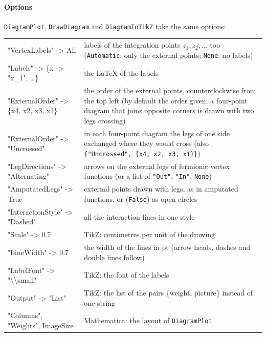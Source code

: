 \documentclass[11pt,a4paper]{article}
\newcommand{\pkg}[1]{\texttt{#1}}
\begin{document}
\paragraph{Options} \pkg{DiagramPlot}, \pkg{DrawDiagram} and \pkg{DiagramToTikZ} take the same options:
\begin{center}
\small
\begin{tabularx}{\textwidth}{@{}>{\ttfamily\small}l>{\raggedright\arraybackslash}X@{}}
\toprule
"VertexLabels" -> All & labels of the integration points $z_1,z_2,\dots$ too (\texttt{Automatic}: only the external
  points; \texttt{None}: no labels)\\
"Labels" -> \{x -> "x\_1", \dots\} & the \LaTeX{} of the labels\\
"ExternalOrder" -> \{x4, x2, x3, x1\} & the order of the external points, counterclockwise from the top left (by
  default the order given; a four-point diagram that joins opposite corners is drawn with two legs crossing)\\
"ExternalOrder" -> "Uncrossed" & in each four-point diagram the legs of one side exchanged where they would cross (also
  \pkg{\{"Uncrossed", \{x4, x2, x3, x1\}\}})\\
"LegDirections" -> "Alternating" & arrows on the external legs of fermionic vertex functions (or a list of
  \texttt{"Out"}, \texttt{"In"}, \texttt{None})\\
"AmputatedLegs" -> True & external points drawn with legs, as in amputated functions, or (\texttt{False}) as open circles\\
"InteractionStyle" -> "Dashed" & all the interaction lines in one style\\
"Scale" -> 0.7 & TikZ: centimetres per unit of the drawing\\
"LineWidth" -> 0.7 & the width of the lines in pt (arrow heads, dashes and double lines follow)\\
"LabelFont" -> "\textbackslash\textbackslash small" & TikZ: the font of the labels\\
"Output" -> "List" & TikZ: the list of the pairs \{weight, picture\} instead of one string\\
"Columns", "Weights", ImageSize & Mathematica: the layout of \pkg{DiagramPlot}\\
\bottomrule
\end{tabularx}
\end{center}
\end{document}
